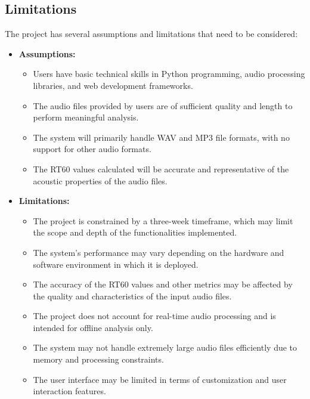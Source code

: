 \documentclass[11pt]{article}
\begin{document}
\subsection{Limitations}

The project has several assumptions and limitations that need to be considered:

\begin{itemize}
    \item \textbf{Assumptions:}
    \begin{itemize}
        \item Users have basic technical skills in Python programming, audio processing libraries, and web development frameworks.
        \item The audio files provided by users are of sufficient quality and length to perform meaningful analysis.
        \item The system will primarily handle WAV and MP3 file formats, with no support for other audio formats.
        \item The RT60 values calculated will be accurate and representative of the acoustic properties of the audio files.
    \end{itemize}
    
    \item \textbf{Limitations:}
    \begin{itemize}
        \item The project is constrained by a three-week timeframe, which may limit the scope and depth of the functionalities implemented.
        \item The system's performance may vary depending on the hardware and software environment in which it is deployed.
        \item The accuracy of the RT60 values and other metrics may be affected by the quality and characteristics of the input audio files.
        \item The project does not account for real-time audio processing and is intended for offline analysis only.
        \item The system may not handle extremely large audio files efficiently due to memory and processing constraints.
        \item The user interface may be limited in terms of customization and user interaction features.
    \end{itemize}
\end{itemize}

\end{document}
